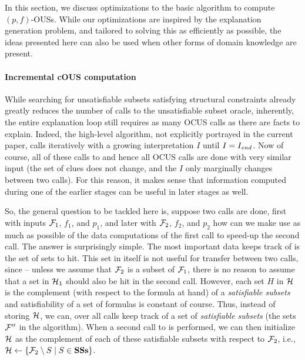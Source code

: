 In this section, we discuss optimizations to the basic algorithm to compute $(p,f)$-OUSs. 
While our optimizations are inspired by the explanation generation problem, and tailored to solving this as efficiently as possible, the ideas presented here can also be used when other forms of domain knowledge are present.  


\paragraph{Incremental cOUS computation}
While searching for unsatisfiable subsets satisfying structural constraints already greatly reduces the number of calls to the unsatisfiable subset oracle, inherently, the entire explanation loop still requires as many OCUS calls as there are facts to explain. 
Indeed, the high-level algorithm, not explicitly portrayed in the current paper, calls \onestep iteratively with a  growing  interpretation $I$ until $I=I_\mathit{end} $.
Now of course, all of these calls to \onestep and hence all OCUS calls are done with very similar input (the set of clues does not change, and the $I$ only marginally changes between two calls). For this reason, it makes sense that information computed during one of the earlier stages can be useful in later stages as well. 

So, the general question to be tackled here is, suppose two \comus calls are done, first with inputs $\mathcal{F} _1$, $f_1$, and $p_1$, and later with $\mathcal{F} _2$, $f_2$, and $p_2$ how can we make use as much as possible of the data computations of the first call to speed-up the second call. The answer is surprisingly simple. The most important data \comus keeps track of  is the set \setstohit of sets to hit.  This set in itself is not useful for transfer between two calls, since -- unless we assume that $\mathcal{F} _2$ is a subset of $\mathcal{F} _1$, there is no reason to assume that a set in $\mathcal{H} _1$ should also be hit in the second call. 
However, each set $H$ in $\mathcal{H} $ is the complement (with respect to the formula at hand) of a \emph{satisfiable subsets} and satisfiability of a set of formulas is constant of course. 
Thus, instead of storing $\mathcal{H} $, we can, over all calls keep track of a set \satsets of \emph{satisfiable subsets} (the sets $\mathcal{F} ''$ in the \comus algorithm). 
When a second call to \comus is performed, we can then initialize $\mathcal{H} $ as the complement of each of these satisfiable subsets with respect to $\mathcal{F} _2$, i.e., $\mathcal{H} \gets \{\mathcal{F} _2\setminus S\mid S\in \mathbf{SSs}\}$. 

